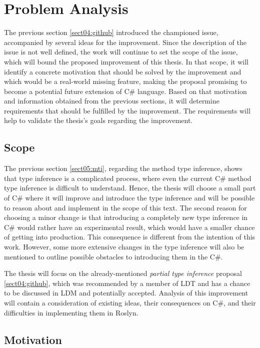 \chapter{Problem Analysis}

The previous section \ref{sect04:github} introduced the championed issue, accompanied by several ideas for the improvement.
Since the description of the issue is not well defined, the work will continue to set the scope of the issue, which will bound the proposed improvement of this thesis. 
In that scope, it will identify a concrete motivation that should be solved by the improvement and which would be a real-world missing feature, making the proposal promising to become a potential future extension of C\# language. 
Based on that motivation and information obtained from the previous sections, it will determine requirements that should be fulfilled by the improvement. 
The requirements will help to validate the thesis’s goals regarding the improvement.

\section{Scope}

The previous section \ref{sect05:mti}, regarding the method type inference, shows that type inference is a complicated process, where even the current C\# method type inference is difficult to understand. 
Hence, the thesis will choose a small part of C\# where it will improve and introduce the type inference and will be possible to reason about and implement in the scope of this text. 
The second reason for choosing a minor change is that introducing a completely new type inference in C\# would rather have an experimental result, which would have a smaller chance of getting into production. 
This consequence is different from the intention of this
work. 
However, some more extensive changes in the type inference will also be mentioned to outline possible obstacles to introducing them in the C\#.
\par
The thesis will focus on the already-mentioned \textit{partial type inference} proposal \ref{sect04:github}, which was recommended by a member of \ac{LDT} and has a chance to be discussed in \ac{LDM} and potentially accepted. 
Analysis of this improvement will contain a consideration of existing ideas, their consequences on C\#, and their difficulties in implementing them in Roslyn.

\section{Motivation} \label{sect10:mot}


